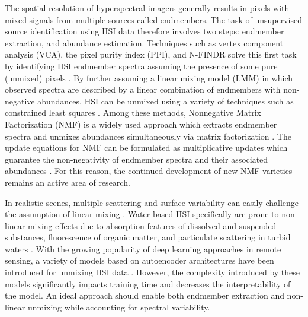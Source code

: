 \documentclass[remotesensing,article,submit,pdftex,moreauthors]{Definitions/mdpi}
\begin{document}
The spatial resolution of hyperspectral imagers generally results in pixels with mixed signals from multiple sources called endmembers. The task of unsupervised source identification using HSI data therefore involves two steps: endmember extraction, and abundance estimation. Techniques such as vertex component analysis (VCA), the pixel purity index (PPI), and N-FINDR solve this first task by identifying HSI endmember spectra assuming the presence of some pure (unmixed) pixels \cite{vca-orig, ppi-orig, N-FINDR-orig}. By further assuming a linear mixing model (LMM) in which observed spectra are described by a linear combination of endmembers with non-negative abundances, HSI can be unmixed using a variety of techniques such as constrained least squares \cite{spectral-unmixing-orig, fcls-unmixing}. Among these methods, Nonnegative Matrix Factorization (NMF) is a widely used approach which extracts endmember spectra and unmixes abundances simultaneously via matrix factorization \cite{nmf-orig, unmixing-nmf-review, unmixing-nmf-review-2}. The update equations for NMF can be formulated as multiplicative updates which guarantee the non-negativity of endmember spectra and their associated abundances \cite{nmf-algorithms}.  For this reason, the continued development of new NMF varieties remains an active area of research.

In realistic scenes, multiple scattering and surface variability can easily challenge the assumption of linear mixing \cite{heylen2014review}. Water-based HSI specifically are prone to non-linear mixing effects due to absorption features of dissolved and suspended substances, fluorescence of organic matter, and particulate scattering in turbid waters \cite{hsi-absorption, hsi-fluorescence, hsi-turibidity}. With the growing popularity of deep learning approaches in remote sensing, a variety of models based on autoencoder architectures have been introduced for unmixing HSI data \cite{non-negative-autoencoders,su2019daen,borsoi2019deep,palsson2020convolutional}. However, the complexity introduced by these models significantly impacts training time and decreases the interpretability of the model. An ideal approach should enable both endmember extraction and non-linear unmixing while accounting for spectral variability. 
\end{document}
